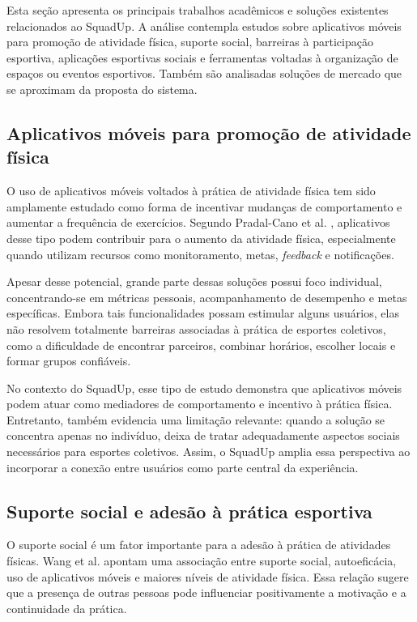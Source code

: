 \documentclass[a4paper, 12pt]{article}
\begin{document}
\begin{justify}
Esta seção apresenta os principais trabalhos acadêmicos e soluções existentes relacionados ao SquadUp. A análise contempla estudos sobre aplicativos móveis para promoção de atividade física, suporte social, barreiras à participação esportiva, aplicações esportivas sociais e ferramentas voltadas à organização de espaços ou eventos esportivos. Também são analisadas soluções de mercado que se aproximam da proposta do sistema.

\subsection{Aplicativos móveis para promoção de atividade física}

O uso de aplicativos móveis voltados à prática de atividade física tem sido amplamente estudado como forma de incentivar mudanças de comportamento e aumentar a frequência de exercícios. Segundo Pradal-Cano et al. \citep{pradal-cano_using_2020}, aplicativos desse tipo podem contribuir para o aumento da atividade física, especialmente quando utilizam recursos como monitoramento, metas, \textit{feedback} e notificações.

Apesar desse potencial, grande parte dessas soluções possui foco individual, concentrando-se em métricas pessoais, acompanhamento de desempenho e metas específicas. Embora tais funcionalidades possam estimular alguns usuários, elas não resolvem totalmente barreiras associadas à prática de esportes coletivos, como a dificuldade de encontrar parceiros, combinar horários, escolher locais e formar grupos confiáveis.

No contexto do SquadUp, esse tipo de estudo demonstra que aplicativos móveis podem atuar como mediadores de comportamento e incentivo à prática física. Entretanto, também evidencia uma limitação relevante: quando a solução se concentra apenas no indivíduo, deixa de tratar adequadamente aspectos sociais necessários para esportes coletivos. Assim, o SquadUp amplia essa perspectiva ao incorporar a conexão entre usuários como parte central da experiência.

\subsection{Suporte social e adesão à prática esportiva}

O suporte social é um fator importante para a adesão à prática de atividades físicas. Wang et al. \citep{wang_association_2019} apontam uma associação entre suporte social, autoeficácia, uso de aplicativos móveis e maiores níveis de atividade física. Essa relação sugere que a presença de outras pessoas pode influenciar positivamente a motivação e a continuidade da prática.


\end{justify}
\end{document}
